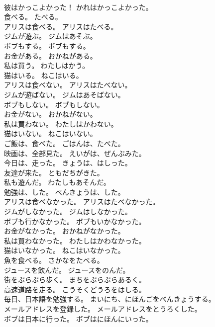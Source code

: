 \documentclass[8pt]{extreport}
\begin{document}
\begin{CJK}{UTF8}{min}
\\	彼はかっこよかった！	かれはかっこよかった。 
\\	食べる。	たべる。 
\\	アリスは食べる。	アリスはたべる。 
\\	ジムが遊ぶ。	ジムはあそぶ。 
\\	ボブもする。	ボブもする。 
\\	お金がある。	おかねがある。 
\\	私は買う。	わたしはかう。 
\\	猫はいる。	ねこはいる。 
\\	アリスは食べない。	アリスはたべない。 
\\	ジムが遊ばない。	ジムはあそばない。 
\\	ボブもしない。	ボブもしない。 
\\	お金がない。	おかねがない。 
\\	私は買わない。	わたしはかわない。 
\\	猫はいない。	ねこはいない。 
\\	ご飯は、食べた。	ごはんは、たべた。 
\\	映画は、全部見た。	えいがは、ぜんぶみた。 
\\	今日は、走った。	きょうは、はしった。 
\\	友達が来た。	ともだちがきた。 
\\	私も遊んだ。	わたしもあそんだ。 
\\	勉強は、した。	べんきょうは、した。 
\\	アリスは食べなかった。	アリスはたべなかった。 
\\	ジムがしなかった。	ジムはしなかった。 
\\	ボブも行かなかった。	ボブもいかなかった。 
\\	お金がなかった。	おかねがなかった。 
\\	私は買わなかった。	わたしはかわなかった。 
\\	猫はいなかった。	ねこはいなかった。 
\\	魚を食べる。	さかなをたべる。 
\\	ジュースを飲んだ。	ジュースをのんだ。 
\\	街をぶらぶら歩く。	まちをぶらぶらあるく。 
\\	高速道路を走る。	こうそくどうろをはしる。 
\\	毎日、日本語を勉強する。	まいにち、にほんごをべんきょうする。 
\\	メールアドレスを登録した。	メールアドレスをとうろくした。 
\\	ボブは日本に行った。	ボブはにほんにいった。 

\end{CJK}
\end{document}
